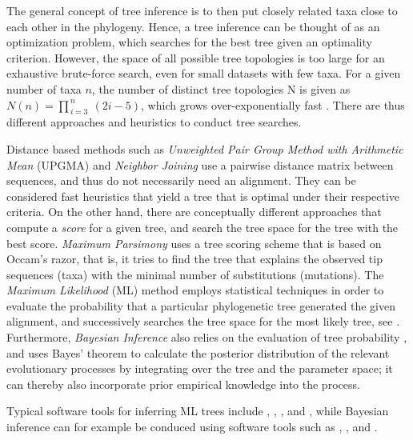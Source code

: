 The general concept of tree inference is to then put closely related taxa close to each other in the phylogeny.
Hence, a tree inference can be thought of as an optimization problem,
which searches for the best tree given an optimality criterion.
However, the space of all possible tree topologies is too large for an exhaustive brute-force search,
even for small datasets with few taxa.
For a given number of taxa $n$, the number of distinct tree topologies N is given as
$N(n) = \prod_{\,i=3}^{\,n} ~(2i - 5)$,
which grows over-exponentially fast \cite{Felsenstein2004}.
There are thus different approaches and heuristics to conduct tree searches.

Distance based methods such as \emph{Unweighted Pair Group Method with Arithmetic Mean} (UPGMA) \cite{Sokal1958}
and \emph{Neighbor Joining} \cite{Saitou1987}
use a pairwise distance matrix between sequences, and thus do not necessarily need an alignment.
They can be considered fast heuristics that yield a tree that is optimal under their respective criteria.
On the other hand, there are conceptually different approaches that compute a \emph{score} for a given tree,
and search the tree space for the tree with the best score.
\emph{Maximum Parsimony} \cite{Sankoff1975} uses a tree scoring scheme that is based on Occam's razor,
that is, it tries to find the tree that explains the observed tip sequences (taxa)
with the minimal number of substitutions (mutations).
The \emph{Maximum Likelihood} (ML) method \cite{Felsenstein1981} employs statistical techniques
in order to evaluate the probability that a particular phylogenetic tree generated the given alignment,
and successively searches the tree space for the most likely tree, see .
Furthermore, \emph{Bayesian Inference} also relies on the evaluation of tree probability \cite{Yang2006},
and uses Bayes' theorem to calculate the posterior distribution of the relevant evolutionary processes
by integrating over the tree and the parameter space;
it can thereby also incorporate prior empirical knowledge into the process.

Typical software tools for inferring ML trees include  \cite{Nguyen2015a},
 \cite{Price2010},  \cite{Zwickl2006}, and  \cite{Stamatakis2014},
while Bayesian inference can for example be conduced using software tools such as  \cite{Suchard2018},
 \cite{Ronquist2003}, and  \cite{Aberer2014}.

